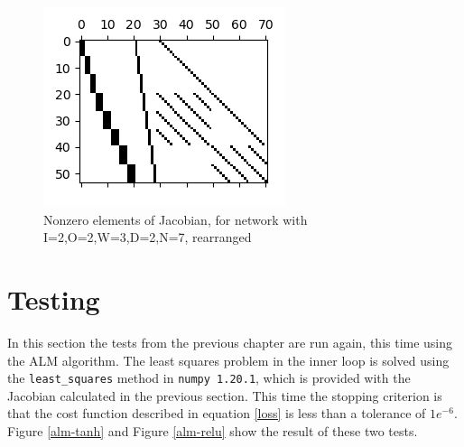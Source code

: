 \begin{figure}[p]
  \centering
  \includegraphics[width=\textwidth]{jac2.png}
  \caption{Nonzero elements of Jacobian, for network with I=2,O=2,W=3,D=2,N=7, rearranged}
  \label{jac2}
\end{figure}

\section{Testing}

In this section the tests from the previous chapter are run again, this time using the ALM algorithm. The least squares problem in the inner loop is solved using the \texttt{least\_squares} method in \texttt{numpy 1.20.1}, which is provided with the Jacobian calculated in the previous section. This time the stopping criterion is that the cost function described in equation \ref{loss} is less than a tolerance of $1e^{-6}$. Figure \ref{alm-tanh} and Figure \ref{alm-relu} show the result of these two tests.